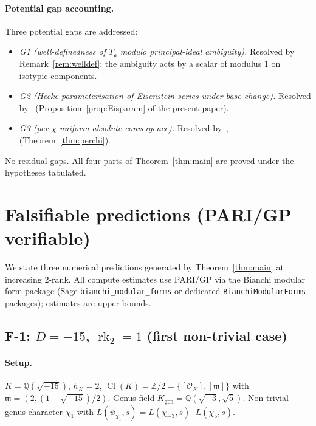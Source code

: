 \documentclass[11pt,a4paper,reqno]{amsart}
\theoremstyle{definition}
\DeclareMathOperator{\Cl}{Cl}
\DeclareMathOperator{\rk}{rk}
\newcommand{\OK}{\mathcal{O}_K}
\newcommand{\QQ}{\mathbb{Q}}
\newcommand{\ZZ}{\mathbb{Z}}
\newcommand{\fa}{\mathfrak{a}}
\newcommand{\fm}{\mathfrak{m}}
\newcommand{\Kgen}{K_{\mathrm{gen}}}
\begin{document}
\paragraph{Potential gap accounting.}
Three potential gaps are addressed:
\begin{itemize}[leftmargin=2em]
  \item \emph{G1 (well-definedness of $T_\fa$ modulo principal-ideal ambiguity).} Resolved by Remark~\ref{rem:welldef}: the ambiguity acts by a scalar of modulus 1 on isotypic components.
  \item \emph{G2 (Hecke parameterisation of Eisenstein series under base change).} Resolved by~\cite[Thm.~7.5]{ElstrodtGrunewaldMennicke1998} (Proposition~\ref{prop:Eisparam} of the present paper).
  \item \emph{G3 (per-$\chi$ uniform absolute convergence).} Resolved by~\cite[\S2.2]{BunkeOlbrich1995},~\cite[\S3]{GangolliWarner1980} (Theorem~\ref{thm:perchi}).
\end{itemize}
No residual gaps. All four parts of Theorem~\ref{thm:main} are proved under the hypotheses tabulated.

\section{Falsifiable predictions (PARI/GP verifiable)}\label{sec:falsif}

We state three numerical predictions generated by Theorem~\ref{thm:main} at increasing 2-rank. All compute estimates use PARI/GP via the Bianchi modular form package (Sage \texttt{bianchi\_modular\_forms} or dedicated \texttt{BianchiModularForms} packages); estimates are upper bounds.

\subsection{F-1: $D=-15$, $\rk_2=1$ (first non-trivial case)}\label{ss:F1}

\paragraph{Setup.}
$K=\QQ(\sqrt{-15})$, $h_K=2$, $\Cl(K)=\ZZ/2 = \{[\OK],[\fm]\}$ with $\fm=(2,(1+\sqrt{-15})/2)$. Genus field $\Kgen = \QQ(\sqrt{-3},\sqrt{5})$. Non-trivial genus character $\chi_1$ with $L(\psi_{\chi_1},s) = L(\chi_{-3},s)\cdot L(\chi_5,s)$.
\end{document}
